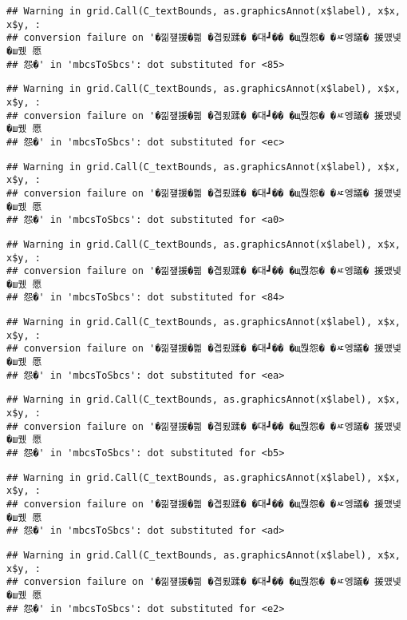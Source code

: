 \documentclass[
]{article}
\begin{document}
\begin{verbatim}
## Warning in grid.Call(C_textBounds, as.graphicsAnnot(x$label), x$x, x$y, :
## conversion failure on '�낆쟾援�쁾 �곕룄蹂� �대┛�� �щ쭩怨� �ㅼ엥議� 援먰넻�ш퀬 愿
## 怨�' in 'mbcsToSbcs': dot substituted for <85>
\end{verbatim}

\begin{verbatim}
## Warning in grid.Call(C_textBounds, as.graphicsAnnot(x$label), x$x, x$y, :
## conversion failure on '�낆쟾援�쁾 �곕룄蹂� �대┛�� �щ쭩怨� �ㅼ엥議� 援먰넻�ш퀬 愿
## 怨�' in 'mbcsToSbcs': dot substituted for <ec>
\end{verbatim}

\begin{verbatim}
## Warning in grid.Call(C_textBounds, as.graphicsAnnot(x$label), x$x, x$y, :
## conversion failure on '�낆쟾援�쁾 �곕룄蹂� �대┛�� �щ쭩怨� �ㅼ엥議� 援먰넻�ш퀬 愿
## 怨�' in 'mbcsToSbcs': dot substituted for <a0>
\end{verbatim}

\begin{verbatim}
## Warning in grid.Call(C_textBounds, as.graphicsAnnot(x$label), x$x, x$y, :
## conversion failure on '�낆쟾援�쁾 �곕룄蹂� �대┛�� �щ쭩怨� �ㅼ엥議� 援먰넻�ш퀬 愿
## 怨�' in 'mbcsToSbcs': dot substituted for <84>
\end{verbatim}

\begin{verbatim}
## Warning in grid.Call(C_textBounds, as.graphicsAnnot(x$label), x$x, x$y, :
## conversion failure on '�낆쟾援�쁾 �곕룄蹂� �대┛�� �щ쭩怨� �ㅼ엥議� 援먰넻�ш퀬 愿
## 怨�' in 'mbcsToSbcs': dot substituted for <ea>
\end{verbatim}

\begin{verbatim}
## Warning in grid.Call(C_textBounds, as.graphicsAnnot(x$label), x$x, x$y, :
## conversion failure on '�낆쟾援�쁾 �곕룄蹂� �대┛�� �щ쭩怨� �ㅼ엥議� 援먰넻�ш퀬 愿
## 怨�' in 'mbcsToSbcs': dot substituted for <b5>
\end{verbatim}

\begin{verbatim}
## Warning in grid.Call(C_textBounds, as.graphicsAnnot(x$label), x$x, x$y, :
## conversion failure on '�낆쟾援�쁾 �곕룄蹂� �대┛�� �щ쭩怨� �ㅼ엥議� 援먰넻�ш퀬 愿
## 怨�' in 'mbcsToSbcs': dot substituted for <ad>
\end{verbatim}

\begin{verbatim}
## Warning in grid.Call(C_textBounds, as.graphicsAnnot(x$label), x$x, x$y, :
## conversion failure on '�낆쟾援�쁾 �곕룄蹂� �대┛�� �щ쭩怨� �ㅼ엥議� 援먰넻�ш퀬 愿
## 怨�' in 'mbcsToSbcs': dot substituted for <e2>
\end{verbatim}
\end{document}
